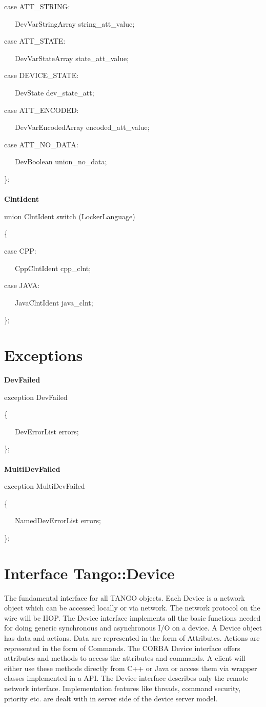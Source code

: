case ATT\_STRING:

~~~DevVarStringArray string\_att\_value;

case ATT\_STATE:

~~~DevVarStateArray state\_att\_value;

case DEVICE\_STATE:

~~~DevState dev\_state\_att;

case ATT\_ENCODED:

~~~DevVarEncodedArray encoded\_att\_value;

case ATT\_NO\_DATA:

~~~DevBoolean union\_no\_data;

\};\textbf{}\\
\textbf{}\\
\textbf{ClntIdent}

union ClntIdent switch (LockerLanguage)

\{

case CPP:

~~~CppClntIdent cpp\_clnt;

case JAVA:

~~~JavaClntIdent java\_clnt;

\};


\section{Exceptions}

\textbf{DevFailed}

exception DevFailed

\{

~~~DevErrorList errors;

\};\textbf{}\\
\textbf{}\\
\textbf{MultiDevFailed}

exception MultiDevFailed

\{

~~~NamedDevErrorList errors;

\};\\



\section{Interface Tango::Device}

The fundamental interface for all TANGO objects. Each Device is a
network object which can be accessed locally or via network. The network
protocol on the wire will be IIOP. The Device interface implements
all the basic functions needed for doing generic synchronous and asynchronous
I/O on a device. A Device object has data and actions. Data are represented
in the form of Attributes. Actions are represented in the form of
Commands. The CORBA Device interface offers attributes and methods
to access the attributes and commands. A client will either use these
methods directly from C++ or Java or access them via wrapper classes
implemented in a API. The Device interface describes only the remote
network interface. Implementation features like threads, command security,
priority etc. are dealt with in server side of the device server model.


